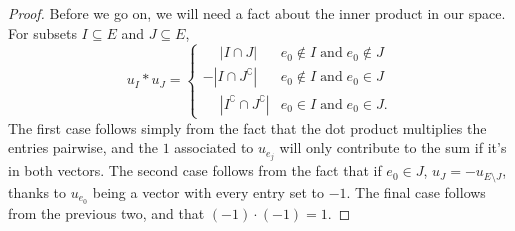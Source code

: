\documentclass[12pt,oneside]{../../sfsuthesis}
\begin{document}
\begin{proof}
    Before we go on, we will need a fact about the inner product in our space.
    For subsets \( I \subseteq E \) and \( J \subseteq E \),
    \[
        u_{I} \ast u_{J} = \begin{cases}
            \phantom{-} | I \cap J |                         & e_0 \notin I \; \text{and} \; e_0 \notin J \\
            - | I \cap J^\complement |                       & e_0 \notin I \; \text{and} \; e_0 \in J    \\
            \phantom{-} | I^\complement \cap J^\complement | & e_0 \in I \; \text{and} \; e_0 \in J.
        \end{cases}
    \]
    The first case follows simply from the fact that the dot product multiplies the entries pairwise, and the \( 1 \) associated to \( u_{e_j} \) will only contribute to the sum if it's in both vectors.
    The second case follows from the fact that if \( e_0 \in J \),  \( u_J = - u_{E \setminus J} \), thanks to \( u_{e_0} \) being a vector with every entry set to \( -1 \).
    The final case follows from the previous two, and that \( (-1) \cdot (-1) = 1 \).


\end{proof}
\end{document}

